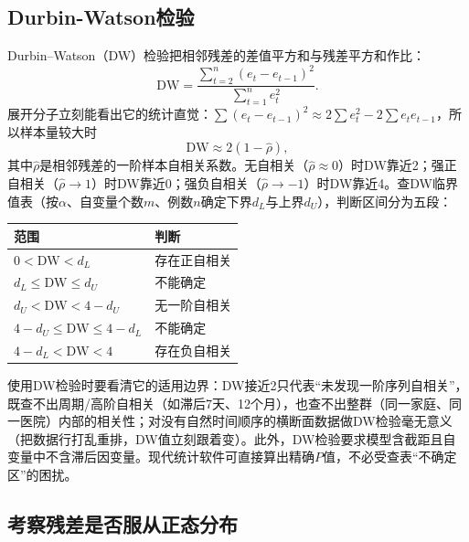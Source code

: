 \subsection{Durbin-Watson检验}
Durbin--Watson（DW）检验把相邻残差的差值平方和与残差平方和作比：
\[
\mathrm{DW}=\frac{\sum_{t=2}^n(e_t-e_{t-1})^2}{\sum_{t=1}^n e_t^2}.
\]
展开分子立刻能看出它的统计直觉：$\sum(e_t-e_{t-1})^2\approx 2\sum e_t^2 - 2\sum e_t e_{t-1}$，所以样本量较大时
\[
\mathrm{DW}\approx 2(1-\widehat\rho),
\]
其中$\widehat\rho$是相邻残差的一阶样本自相关系数。无自相关（$\widehat\rho\approx 0$）时DW靠近2；强正自相关（$\widehat\rho\to 1$）时DW靠近0；强负自相关（$\widehat\rho\to -1$）时DW靠近4。查DW临界值表（按$\alpha$、自变量个数$m$、例数$n$确定下界$d_L$与上界$d_U$），判断区间分为五段：
\begin{center}\small\begin{tabular}{ll}
\toprule 范围&判断\\\midrule
$0<\mathrm{DW}<d_L$&存在正自相关\\
$d_L\le\mathrm{DW}\le d_U$&不能确定\\
$d_U<\mathrm{DW}<4-d_U$&无一阶自相关\\
$4-d_U\le\mathrm{DW}\le4-d_L$&不能确定\\
$4-d_L<\mathrm{DW}<4$&存在负自相关\\\bottomrule
\end{tabular}\end{center}
使用DW检验时要看清它的适用边界：DW接近2只代表“未发现一阶序列自相关”，既查不出周期/高阶自相关（如滞后7天、12个月），也查不出整群（同一家庭、同一医院）内部的相关性；对没有自然时间顺序的横断面数据做DW检验毫无意义（把数据行打乱重排，DW值立刻跟着变）。此外，DW检验要求模型含截距且自变量中不含滞后因变量。现代统计软件可直接算出精确$P$值，不必受查表“不确定区”的困扰。
\begin{center}\end{center}\subsection{考察残差是否服从正态分布}
